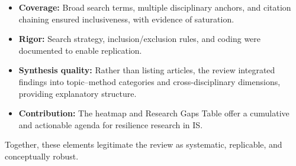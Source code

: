 \begin{itemize}
    \item \textbf{Coverage:} Broad search terms, multiple disciplinary anchors, and citation chaining ensured inclusiveness, with evidence of saturation.
    \item \textbf{Rigor:} Search strategy, inclusion/exclusion rules, and coding were documented to enable replication.  
    \item \textbf{Synthesis quality:} Rather than listing articles, the review integrated findings into topic–method categories and cross-disciplinary dimensions, providing explanatory structure.  
    \item \textbf{Contribution:} The heatmap and Research Gaps Table offer a cumulative and actionable agenda for resilience research in IS.\\
\end{itemize}

Together, these elements legitimate the review as systematic, replicable, and conceptually robust.  



